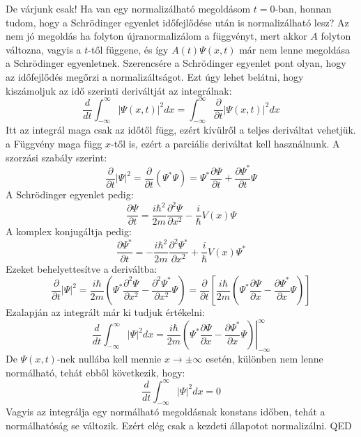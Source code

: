 \documentclass[../main.tex]{subfiles}
\begin{document}
De várjunk csak! Ha van egy normalizálható megoldásom $t = 0$-ban, honnan tudom, hogy a Schrödinger egyenlet időfejlődése után is normalizálható lesz? Az nem jó megoldás ha folyton újranormalizálom
a függvényt, mert akkor $A$ folyton változna, vagyis a $t$-től függene, és így $A(t)\Psi(x,t)$ már nem lenne megoldása a Schrödinger egyenletnek.
Szerencsére a Schrödinger egyenlet pont olyan, hogy az időfejlődés megőrzi a normalizáltságot. Ezt úgy lehet belátni, hogy kiszámoljuk az idő szerinti deriváltját az integrálnak:
\begin{equation}
    \frac{d}{dt} \int_{-\infty}^{\infty} |\Psi(x,t)|^2 dx = \int_{-\infty}^{\infty} \frac{\partial}{\partial t} |\Psi(x,t)|^2 dx
\end{equation}
Itt az integrál maga csak az időtől függ, ezért kívülről a teljes deriváltat vehetjük. a Függvény maga függ $x$-től is, ezért a parciális deriváltat kell használnunk. A szorzási szabály szerint:
\begin{equation}
    \frac{\partial}{\partial t} |\Psi|^2 = \frac{\partial}{\partial t} (\Psi^* \Psi) = \Psi^* \frac{\partial \Psi}{\partial t} + \frac{\partial \Psi^*}{\partial t} \Psi
\end{equation}
A Schrödinger egyenlet pedig:
\begin{equation}
    \frac{\partial \Psi}{\partial t} = \frac{i \hbar^2}{2m} \frac{\partial^2 \Psi}{\partial x^2} - \frac{i}{\hbar} V(x) \Psi
\end{equation}
A komplex konjugáltja pedig:
\begin{equation}
    \frac{\partial \Psi^*}{\partial t} = -\frac{i \hbar^2}{2m} \frac{\partial^2 \Psi^*}{\partial x^2} + \frac{i}{\hbar} V(x) \Psi^*
\end{equation}
Ezeket behelyettesítve a deriváltba:
\begin{equation}
    \frac{\partial}{\partial t} |\Psi|^2 = \frac{i\hbar}{2m} \left( \Psi^* \frac{\partial^2 \Psi}{\partial x^2} - \frac{\partial^2 \Psi^*}{\partial x^2} \Psi \right) = \frac{\partial}{\partial t} \left[\frac{i \hbar}{2m} \left(\Psi^* \frac{\partial \Psi}{\partial x} - \frac{\partial \Psi^*}{\partial x}\Psi \right)\right]
\end{equation}
Ezalapján az integrált már ki tudjuk értékelni:
\begin{equation}
    \frac{d}{dt} \int_{-\infty}^{\infty} |\Psi|^2 dx = \left. \frac{i \hbar}{2m} \left( \Psi^* \frac{\partial \Psi}{\partial x} - \frac{\partial \Psi^*}{\partial x} \Psi \right) \right|_{-\infty}^{\infty}
\end{equation}
De $\Psi(x, t)$-nek nullába kell mennie $x \to \pm \infty$ esetén, különben nem lenne normálható, tehát ebből következik, hogy:
\begin{equation}
    \frac{d}{dt} \int_{-\infty}^{\infty} |\Psi|^2 dx = 0
\end{equation}
Vagyis az integrálja egy normálható megoldásnak konstans időben, tehát a normálhatóság se változik. Ezért elég csak a kezdeti állapotot normalizálni. QED 
\end{document}
